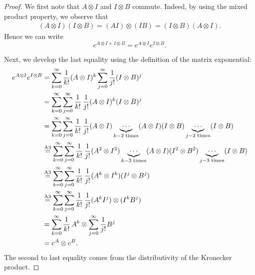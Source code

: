 \documentclass[11pt]{article}
\newcommand{\kp}{\otimes} %
\begin{document}
\begin{proof}
We first note that $A\kp I$ and $I\kp B$ commute.
Indeed, by using the mixed product property, we observe that
\begin{align*}
    (A\kp I)(I\kp B)=(AI)\kp(IB)=(I\kp B)(A\kp I).
\end{align*}
Hence we can write
\begin{equation*}
    e^{A\kp I+I\kp B}=e^{A\kp I}e^{I\kp B}.
\end{equation*}

Next, we develop the last equality using the definition of the matrix exponential:
\begin{align*}
    e^{A\kp I}e^{I\kp B}&=\sum_{k=0}^{\infty}\frac{1}{k!}(A\kp I)^k \sum_{j=0}^{\infty}\frac{1}{j!}(I\kp B)^j\\
    &=\sum_{k=0}^{\infty}\sum_{j=0}^{\infty}\frac{1}{k!}\,\frac{1}{j!}(A\kp I)^k (I\kp B)^j\\
    &=\sum_{k=0}^{\infty}\sum_{j=0}^{\infty}\frac{1}{k!}\,\frac{1}{j!}(A\kp I)\underbrace{\cdots}_{k-2 \textnormal{ times}} (A\kp I)(I\kp B)\underbrace{\cdots}_{j-2 \textnormal{ times}}(I\kp B)\\
    &\overset{\textnormal{A3}}{=} \sum_{k=0}^{\infty}\sum_{j=0}^{\infty}\frac{1}{k!}\,\frac{1}{j!}(A^2\kp I^2)\underbrace{\cdots}_{k-3 \textnormal{ times}} (A\kp I)(I^2\kp B^2)\underbrace{\cdots}_{j-3 \textnormal{ times}}(I\kp B)\\
    &\overset{\textnormal{A3}}{=} \sum_{k=0}^{\infty}\sum_{j=0}^{\infty}\frac{1}{k!}\,\frac{1}{j!}(A^k\kp I^k) (I^j\kp B^j)\\
    &\overset{\textnormal{A3}}{=} \sum_{k=0}^{\infty}\sum_{j=0}^{\infty}\frac{1}{k!}\,\frac{1}{j!}(A^kI^j)\kp (I^k B^j)\\
        &= \sum_{k=0}^{\infty}\frac{1}{k!}\,A^k\kp\sum_{j=0}^{\infty}\frac{1}{j!} B^j\\
        &= e^A\kp e^B.
\end{align*}
The second to last equality comes from the distributivity of the Kronecker product.


\end{proof}
\end{document}
